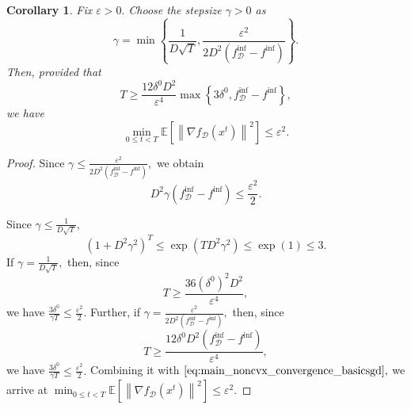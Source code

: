 \documentclass{article}
\newcommand{\bb}{\mathbb}
\newcommand{\Exp}[1]{{\bb E}\left[#1\right]}
\theoremstyle{plain}
\newtheorem{corollary}{Corollary}
\newcommand{\tf}{f_{\mathcal{D}}}
\theoremstyle{plain}
\theoremstyle{definition}
\theoremstyle{remark}
\begin{document}
\begin{corollary}
	Fix $\varepsilon>0.$ Choose the stepsize $\gamma>0$ as
	\begin{equation*}
		\gamma = \min\left\lbrace \frac{1}{D\sqrt{ T}}, \frac{\varepsilon^2}{2D^2\left(\tf^{\inf} - f^{\inf}\right)} \right\rbrace.
	\end{equation*}
	Then, provided that
	\begin{equation*}
		T\geq \frac{12\delta^0D^2}{\varepsilon^4}\max\left\lbrace 3\delta^0, \tf^{\inf} - f^{\inf}\right\rbrace,
	\end{equation*}
	we have
	\begin{equation*}
		\min_{0 \leq t < T}\Exp{\left\|\nabla \tf(x^t)\right\|^2}\leq\varepsilon^2.
	\end{equation*}
\end{corollary}
\begin{proof}
	Since $\gamma \leq \frac{\varepsilon^2}{2D^2\left(\tf^{\inf} - f^{\inf}\right)},$ we obtain
	\begin{equation*}
		D^{2} \gamma \left(\tf^{\inf} - f^{\inf}\right) \leq \frac{\varepsilon^2}{2}.
	\end{equation*}

	Since $\gamma\leq \frac{1}{D\sqrt{T}},$
	\begin{equation*}
		\left(1+D^2\gamma^2\right)^T\leq \exp\left(TD^2\gamma^2\right)\leq\exp(1)\leq 3.
	\end{equation*}
	If $\gamma = \frac{1}{D\sqrt{T}},$ then, since
	\begin{equation*}
		T\geq \frac{36\left(\delta^0\right)^2D^2}{\varepsilon^4},
	\end{equation*}
	we have $\frac{3\delta^0}{\gamma T}\leq \frac{\varepsilon^2}{2}.$ Further, if $\gamma= \frac{\varepsilon^2}{2D^2\left(\tf^{\inf} - f^{\inf}\right)},$ then, since
	\begin{equation*}
		T\geq \frac{12\delta^0D^2\left(\tf^{\inf} - f^{\inf}\right)}{\varepsilon^4},
	\end{equation*}
	we have $\frac{3\delta^0}{\gamma T}\leq \frac{\varepsilon^2}{2}.$
	Combining it with $\eqref{eq:main_noncvx_convergence_basicsgd},$ we arrive at $\min_{0 \leq t < T}\Exp{\left\|\nabla \tf(x^t)\right\|^2}\leq\varepsilon^2.$
\end{proof}
\end{document}

